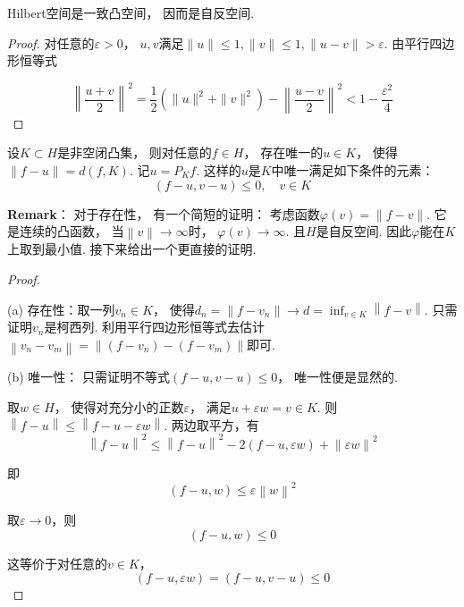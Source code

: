

\begin{proposition}
    Hilbert空间是一致凸空间，
    因而是自反空间.
\end{proposition}

\begin{proof}
    对任意的$\varepsilon >0$，
    $u,v$满足$\| u \| \le 1, \|v\| \le 1, \| u -v\| > \varepsilon$.
    由平行四边形恒等式

    \[
    \left\| \frac{u+v}{2} \right\|^2 = \frac{1}{2}(\|u\|^2 + \| v \|^2) - 
    \left\| \frac{u-v}{2} \right\|^2 < 1 - \frac{\varepsilon^2}{4}
    \]
\end{proof}

\begin{theorem}[点到闭凸集上的投影]
    设$K \subset H$是非空闭凸集，
    则对任意的$f \in H$，
    存在唯一的$u \in K$，
    使得$\|f-u\|=d(f , K)$.
    记$u = P_K f$.
    这样的$u$是$K$中唯一满足如下条件的元素：
    $$
    (f-u,v-u) \le 0, \quad v \in K
    $$
\end{theorem}

\begin{remarkbox}
    \textbf{Remark}：
    对于存在性，
    有一个简短的证明：
    考虑函数$\varphi(v) = \| f-v \|$.
    它是连续的凸函数，
    当$\left\| v \right\| \to \infty$时，
    $\varphi(v) \to \infty$.
    且$H$是自反空间.
    因此$\varphi$能在$K$上取到最小值.
    接下来给出一个更直接的证明.
\end{remarkbox}

\begin{proof}~

    (a) 存在性：取一列$v_n \in K$，
    使得$d_n = \left\| f-v_n \right\| \to d = \inf_{v \in K} \left\| f - v\right\| $.
    只需证明$v_n$是柯西列.
    利用平行四边形恒等式去估计$\left\| v_n - v_m \right\| = \left\| (f - v_n) - (f - v_m) \right\|$即可.

    \smallskip

    (b) 唯一性：
    只需证明不等式$(f-u , v-u) \le 0$，
    唯一性便是显然的.

    取$w \in H$，
    使得对充分小的正数$\varepsilon$，
    满足$u + \varepsilon w = v\in K$.
    则$\left\| f - u\right\| \le \left\| f - u - \varepsilon w\right\|$.
    两边取平方，有
    \[
    \left\| f-u  \right\|^2 \le \left\| f-u\right\|^2 - 2 (f-u , \varepsilon w) + \left\| \varepsilon w \right\|^2 
    \]

    即
    \[
    (f-u , w) \le \varepsilon \left\| w \right\|^2
    \]

    取$\varepsilon \to 0$，则
    \[
    (f-u , w) \le 0
    \]

    这等价于对任意的$v \in K$，
    \[
    (f-u , \varepsilon w) = (f-u , v - u) \le 0
    \]
\end{proof}

